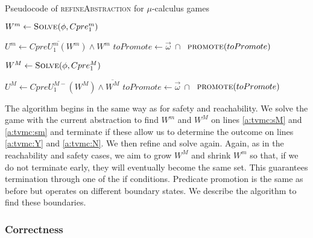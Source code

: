 \begin{algorithm}

\caption{Pseudocode of \textsc{refineAbstraction} for $\mu$-calculus games}
\label{alg:refineAbstraction}

\begin{algorithmic}[1]


        \State $W^m \gets \textsc{Solve}(\phi, Cpre_1^m)$

        \State $U^m \gets \overline{CpreU_1^{m}(W^m)} \land W^m$
            \State $toPromote \gets \vec{\omega}~\cap~$
            \State $\Call{promote}{toPromote}$
        \Else
            \State {}
        \EndIf


        \State $W^M \gets \textsc{Solve}(\phi, Cpre_1^M)$

        \State $U^M \gets CpreU_1^{M-}(W^M) \land \overline{W^M}$
            \State $toPromote \gets \vec{\omega}~\cap~$
            \State $\Call{promote}{toPromote}$
        \Else
            \State {}
        \EndIf

    \EndIf
\EndFunction
\end{algorithmic}
\end{algorithm}

The algorithm begins in the same way as for safety and reachability. We solve the game with the current abstraction to find $W^m$ and $W^M$ on lines \ref{a:tvmc:sM} and \ref{a:tvmc:sm} and terminate if these allow us to determine the outcome on lines \ref{a:tvmc:Y} and \ref{a:tvmc:N}. We then refine and solve again. Again, as in the reachability and safety cases, we aim to grow $W^M$ and shrink $W^m$ so that, if we do not terminate early, they will eventually become the same set. This guarantees termination through one of the if conditions. Predicate promotion is the same as before but operates on different boundary states. We describe the algorithm to find these boundaries. 

\subsubsection{Correctness}


